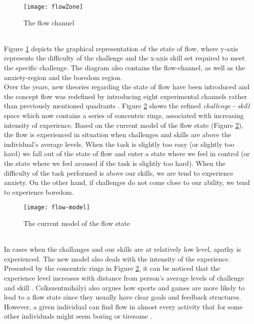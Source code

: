 \begin{figure}[h]
    \centering
    \texttt{[image: flowZone]}
    \caption{The flow channel \cite{csikszentmihalyi1996flow}}
    \label{fig:flowZone}
\end{figure}\\
Figure \ref{fig:flowZone} depicts the graphical representation of the state of flow, where y-axis represents the difficulty of the challenge and the x-axis skill set required to meet the specific challenge. The diagram also contains the flow-channel, as well as the anxiety-region and the boredom region.\\
Over the years, new theories regarding the state of flow have been introduced and the concept flow was redefined by introducing eight experimental channels rather than previously mentioned quadrants \cite{nakamura2014concept}. Figure \ref{fig:flowModel} shows the refined \textit{challenge} - \textit{skill} space which now contains a series of concentric rings, associated with increasing intensity of experience. Based on the current model of the flow state (Figure \ref{fig:flowModel}), the flow is experienced in situation when challenges and skills are above the individual's average levels. When the task is slightly too easy (or slightly too hard) we fall out of the state of flow and enter a state where we feel in control (or the state where we feel aroused if the task is slightly too hard). When the difficulty of the task performed is above our skills, we are tend to experience anxiety. On the other hand, if challenges do not come close to our ability, we tend to experience boredom. \\
\begin{figure}[h]
    \centering
    \texttt{[image: flow-model]}
    \caption{The current model of the flow state \cite{nakamura2014concept}}
    \label{fig:flowModel}
\end{figure}\\
In cases when the challanges and our skills are at relatively low level, apathy is experienced. The new model also deals with the intensity of the experience. Presented by the concentric rings in Figure \ref{fig:flowModel}, it can be noticed that the experience level increases with distance from person's average levels of challenge and skill \cite{nakamura2014concept}. Cs\'{i}kszentmih\'{a}lyi also argues how sports and games are more likely to lead to a flow state since they usually have clear goals and feedback structures. However, a given individual can find flow in almost every activity that for some other individuals might seem boring or tiresome \cite{csikszentmihalyi2014flow}.
